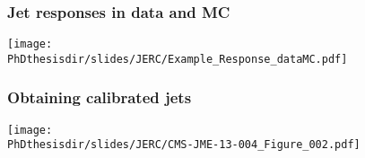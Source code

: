 \begin{frame}
\frametitle{Jet responses in data and MC}
\begin{center}
\texttt{[image: \\PhDthesisdir/slides/JERC/Example\_Response\_dataMC.pdf]}
\end{center}
\end{frame}

\begin{frame}
\frametitle{Obtaining calibrated jets}
\begin{center}
\texttt{[image: \\PhDthesisdir/slides/JERC/CMS-JME-13-004\_Figure\_002.pdf]}
\end{center}
\end{frame}
